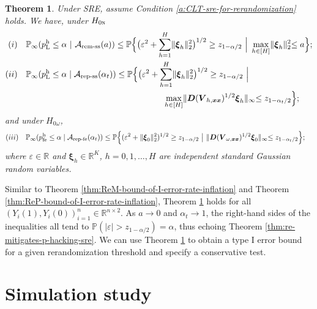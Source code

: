 \documentclass[12pt]{article}
\newtheorem{theorem}{Theorem}
\newcommand{\hpfe}{p_\textnormal{fe}^{\textnormal{h}}}
\newcommand{\Prob}{\mathbb{P}}
\newcommand{\ma}{\mathcal{A}}
\newcommand{\remss}{\textnormal{rem-ss}}
\newcommand{\repss}{\textnormal{rep-ss}}
\newcommand{\repfe}{\textnormal{rep-fe}}
\newcommand{\bs}{\boldsymbol}
\newcommand{\hpL}{p_\textnormal{L}^{\textnormal{h}}}
\begin{document}
\begin{theorem}
\label{thm:inflation-bound-sre}
Under SRE, assume Condition \ref{a:CLT-sre-for-rerandomization} holds. We have, under $H_{0\textsc{n}}$
    \begin{align*}
     (i)\quad   &\Prob_{\infty}( \hpL \leq \alpha~ | ~\ma_{\remss}(a))   \leq \Prob\Big\{\big(\varepsilon^{2}+\sum_{h=1}^H \lVert\bs{\xi}_h\lVert_2^2 \big)^{1/2} \geq z_{1-\alpha/2}~\Big | ~ \max_{h\in  [H] } \lVert\bs{\xi}_h\lVert_2^2 \leq a\Big\};\\
      (ii)\quad   &\Prob_{\infty}( \hpL \leq \alpha\mid \ma_{\repss}(\alpha_t)) \leq   \Prob \Big\{\big(\varepsilon^{2}+\sum_{h=1}^H \lVert\bs{\xi}_h\lVert_2^2 \big)^{1/2} \geq z_{1-\alpha/2} ~ \Big | \\
      &\qquad \qquad \qquad \qquad \qquad \qquad \qquad \qquad ~ \max_{h\in  [H] } \lVert\bs{D}(\bs{V}_{h,\bs{x}\bs{x}})^{1/2}\bs{\xi}_h\lVert_{\infty} \leq z_{1-\alpha_t/2}\Big\};
    \end{align*}
    and  under $H_{0\omega}$,
    \begin{align*}
             (iii)\quad    & \Prob_{\infty}( \hpfe \leq \alpha\mid \ma_{\repfe}(\alpha_t)) \leq 
 \Prob\Big\{(\varepsilon^{2}+ \lVert\bs{\xi}_0\lVert_2^2 )^{1/2} \geq z_{1-\alpha/2}~ \big | ~ \lVert\bs{D}(\bs{V}_{\omega,\bs{x}\bs{x}})^{1/2}\bs{\xi}_0\lVert_{\infty} \leq z_{1-\alpha_t/2} \Big\};
    \end{align*}
    where $\varepsilon \in \mathbb{R}$ and $\bs{\xi}_{h} \in \mathbb{R}^K$, $h=0,1,\ldots,H$ are independent standard Gaussian random variables.
\end{theorem}

 Similar to Theorem \ref{thm:ReM-bound-of-I-error-rate-inflation} and Theorem \ref{thm:ReP-bound-of-I-error-rate-inflation}, Theorem \ref{thm:inflation-bound-sre} holds for all $(Y_i(1),Y_i(0))_{i=1}^n \in \mathbb{R}^{n\times 2}$. As $a\rightarrow 0$ and $\alpha_t \rightarrow 1$, the right-hand sides of the inequalities all tend to $\Prob(|\varepsilon|>z_{1-\alpha/2}) = \alpha$, thus echoing Theorem \ref{thm:re-mitigates-p-hacking-sre}. We can use Theorem \ref{thm:inflation-bound-sre} to obtain a type I error bound for a given rerandomization threshold and specify a conservative test. 


\section{Simulation study}
\label{sec:simulation}
\end{document}
